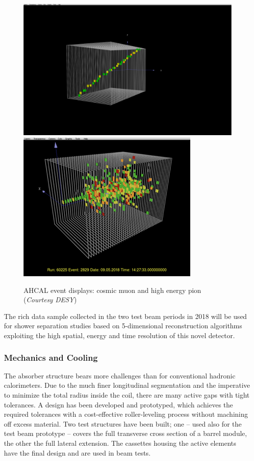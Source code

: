 \begin{figure}
	\centering
	\includegraphics[width=.49\linewidth]{Calorimeter/AHCAL/AHCalEvtDisplay1}
	\includegraphics[width=.49\linewidth]{Calorimeter/AHCAL/AHCalEvtDisplay2}
	\caption{AHCAL event displays: cosmic muon and high energy pion ({\it Courtesy DESY})}
	\label{fig:AHCAL:EvtDisplay}
\end{figure}

The rich data sample collected in the two test beam periods in 2018 will be used for shower separation studies based on 5-dimensional reconstruction algorithms exploiting the high spatial, energy and time resolution of this novel detector.

\subsubsection{Mechanics and Cooling}

The absorber structure bears more challenges than for conventional hadronic calorimeters. Due to the much finer longitudinal segmentation and the imperative to minimize the total radius inside the coil, there are many active gaps with tight tolerances. A design has been developed and prototyped, which achieves the required tolerances with a cost-effective roller-leveling process without machining off excess material. Two test structures have been built; one -- used also for the test beam prototype -- covers the full transverse cross section of a barrel module, the other the full lateral extension. The cassettes housing the active elements have the final design and are used in beam tests.

